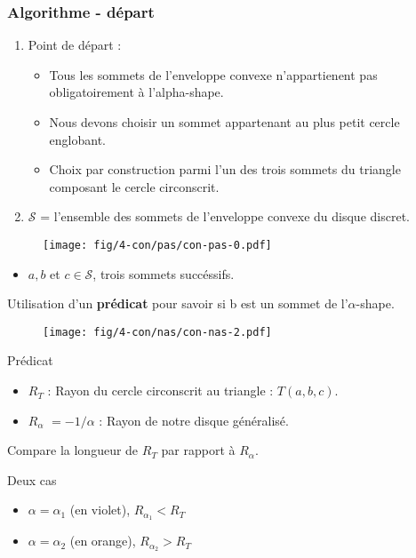 \begin{frame}
\frametitle{Algorithme - départ}

{
  \begin{block}{}
    \begin{enumerate}
      \item Point de départ :
      \begin{itemize}
        \item Tous les sommets de l'enveloppe convexe n'appartienent pas obligatoirement à l'alpha-shape.
        \item Nous devons choisir un sommet appartenant au plus petit cercle englobant.
        \item Choix par construction parmi l'un des trois sommets du triangle composant le cercle circonscrit.
      \end{itemize}

      \item  $\mathcal{S}$ = l'ensemble des sommets de l'enveloppe convexe du disque discret.
    \end{enumerate}
  \end{block}
}  
{
  \begin{figure}[H]
    \centering
    \texttt{[image: fig/4-con/pas/con-pas-0.pdf]}
  \end{figure}
}  

{
  \begin{block}{}
    \begin{itemize}
      \item $a,b$ et $c \in \mathcal{S}$, trois sommets succéssifs.
    \end{itemize} 
    Utilisation d'un \textbf{prédicat} pour savoir si b est un sommet de l'$\alpha$-shape.
  \end{block}
}

{
  \begin{figure}[H]
    \centering
    \texttt{[image: fig/4-con/nas/con-nas-2.pdf]}
  \end{figure}
}  

{
  \begin{block}{Prédicat}
    \begin{itemize}
      \item \textbf{$R_T$} : Rayon du cercle circonscrit au triangle : $T(a, b, c)$.
      \item \textbf{$R_{\alpha}$} $= -1/\alpha$ : Rayon de notre disque généralisé.
    \end{itemize}      
    Compare la longueur de \textbf{$R_T$} par rapport à \textbf{$R_{\alpha}$}.\\
  \end{block}
}
{
  \begin{alertblock}{Deux cas}
    \begin{itemize}
      \item $\alpha = \alpha_{1}$ (en violet), \textbf{$R_{\alpha_{1}} < R_T$}
      \item $\alpha = \alpha_{2}$ (en orange), \textbf{$R_{\alpha_{2}} > R_T$}
    \end{itemize}
  \end{alertblock}
}


\end{frame}
